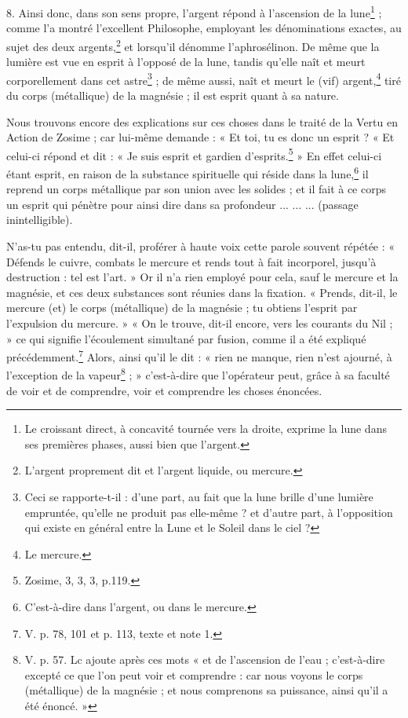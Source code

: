 \documentclass[landscape, a4paper, 11pt, oneside, polutonikogreek, french]{article}
\begin{document}
8. Ainsi donc, dans son sens propre, l'argent répond à l'ascension de la lune\footnote{Le croissant direct, à concavité tournée vers la droite, exprime la lune dans ses premières phases, aussi bien que l'argent.} ; comme l'a montré l'excellent Philosophe, employant les dénominations exactes, au sujet des deux argents,\footnote{L'argent proprement dit et l'argent liquide, ou mercure.} et lorsqu'il dénomme l'aphrosélinon. De même que la lumière est vue en esprit à l'opposé de la lune, tandis qu'elle naît et meurt corporellement dans cet astre\footnote{Ceci se rapporte-t-il : d'une part, au fait que la lune brille d'une lumière empruntée, qu'elle ne produit pas elle-même ? et d'autre part, à l'opposition qui existe en général entre la Lune et le Soleil dans le ciel ?} ; de même aussi, naît et meurt le (vif) argent,\footnote{Le mercure.} tiré du corps (métallique) de la magnésie ; il est esprit quant à sa nature.

Nous trouvons encore des explications sur ces choses dans le traité de la Vertu en Action de Zosime ; car lui-même demande : « Et toi, tu es donc un esprit ? « Et celui-ci répond et dit : « Je suis esprit et gardien d'esprits.\footnote{Zosime, 3, 3, 3, p.119.} » En effet celui-ci étant esprit, en raison de la substance spirituelle qui réside dans la lune,\footnote{C'est-à-dire dans l'argent, ou dans le mercure.} il reprend un corps métallique par son union avec les solides ; et il fait à ce corps un esprit qui pénètre pour ainsi dire dans sa profondeur ... ... ... (passage inintelligible).

N'as-tu pas entendu, dit-il, proférer à haute voix cette parole souvent répétée : « Défends le cuivre, combats le mercure et rends tout à fait incorporel, jusqu'à destruction : tel est l'art. » Or il n'a rien employé pour cela, sauf le mercure et la magnésie, et ces deux substances sont réunies dans la fixation. « Prends, dit-il, le mercure (et) le corps (métallique) de la magnésie ; tu obtiens l'esprit par l'expulsion du mercure. » « On le trouve, dit-il encore, vers les courants du Nil ; » ce qui signifie l'écoulement simultané par fusion, comme il a été expliqué précédemment.\footnote{V. p. 78, 101 et p. 113, texte et note 1.} Alors, ainsi qu'il le dit : « rien ne manque, rien n'est ajourné, à l'exception de la vapeur\footnote{V. p. 57. Lc ajoute après ces mots « et de l'ascension de l'eau ; c'est-à-dire excepté ce que l'on peut voir et comprendre : car nous voyons le corps (métallique) de la magnésie ; et nous comprenons sa puissance, ainsi qu'il a été énoncé. »} ; » c'est-à-dire que l'opérateur peut, grâce à sa faculté de voir et de comprendre, voir et comprendre les choses énoncées.
\end{document}

